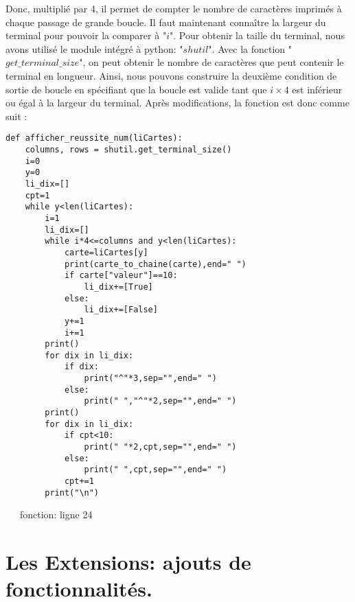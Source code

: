 \documentclass[10pt,a4paper,french,titlepage]{article}
\begin{document}
Donc, multiplié par 4, il permet de compter le nombre de caractères imprimés à chaque passage de grande boucle. Il faut maintenant connaître la largeur du terminal pour pouvoir la comparer à "$i$". Pour obtenir la taille du terminal, nous avons utilisé le module intégré à python: "$shutil$". Avec la fonction "$get\_terminal\_size$", on peut obtenir le nombre de caractères que peut  contenir le terminal en longueur. Ainsi, nous pouvons construire la deuxième condition de sortie de boucle en spécifiant que la boucle est valide tant que $i \times 4$ est inférieur ou égal à la largeur du terminal. Après modifications, la fonction est donc comme suit :
\begin{lstlisting}
def afficher_reussite_num(liCartes):
    columns, rows = shutil.get_terminal_size()
    i=0
    y=0
    li_dix=[]
    cpt=1
    while y<len(liCartes):
        i=1
        li_dix=[]
        while i*4<=columns and y<len(liCartes): 
            carte=liCartes[y]
            print(carte_to_chaine(carte),end=" ")
            if carte["valeur"]==10:
                li_dix+=[True]
            else:
                li_dix+=[False]
            y+=1
            i+=1
        print()
        for dix in li_dix:
            if dix:
                print("^"*3,sep="",end=" ")
            else:
                print(" ","^"*2,sep="",end=" ")
        print()
        for dix in li_dix:
            if cpt<10:
                print(" "*2,cpt,sep="",end=" ")
            else:
                print(" ",cpt,sep="",end=" ")
            cpt+=1
        print("\n")
\end{lstlisting}
~~~fonction: ligne 24



\section{Les Extensions: ajouts de fonctionnalités.}
\end{document}
